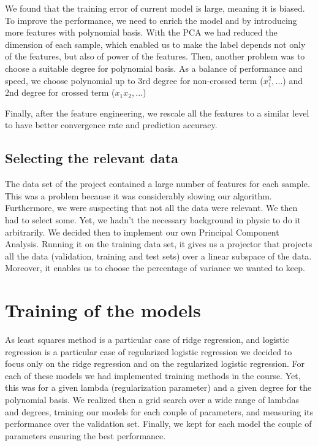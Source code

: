 \documentclass[a4paper, 10pt]{article}
\begin{document}
		We found that the training error of current model is large, meaning it is biased. To improve the performance, we need to enrich the model and by introducing more features with polynomial basis.  With the PCA we had reduced the dimension of each sample, which enabled us to make the label depends not only of the features, but also of power of the features. Then, another problem was to choose a suitable degree for polynomial basis. As a balance of performance and speed, we choose polynomial up to 3rd degree for non-crossed term ($x_1^2, ...$)  and 2nd degree for crossed term ($x_1x_2,...$)
		
		Finally, after the feature engineering, we rescale all the features to a similar level to have better convergence rate and prediction accuracy.
		
		\subsection{Selecting the relevant data}		
		The data set of the project contained a large number of features for each sample. This was a problem because it was considerably slowing our algorithm. Furthermore, we were suspecting that not all the data were relevant. We then had to select some. Yet, we hadn't the necessary background in physic to do it arbitrarily. We decided then to implement our own Principal Component Analysis. Running it on the training data set, it gives us a projector that projects all the data (validation, training and test sets) over a linear subspace of the data. Moreover, it enables us to choose the percentage of variance we wanted to keep.
		
	\section{Training of the models}
	
		As least squares method is a particular case of ridge regression, and logistic regression is a particular case of regularized logistic regression we decided to focus only on the ridge regression and on the regularized logistic regression.  For each of these models we had implemented training methods in the course. Yet, this was for a given lambda (regularization parameter) and a given degree for the polynomial basis. We realized then a grid search over a wide range of lambdas and degrees, training our models for each couple of parameters, and measuring its performance over the validation set. Finally, we kept for each model the couple of parameters ensuring the best performance. 
		
\end{document}

